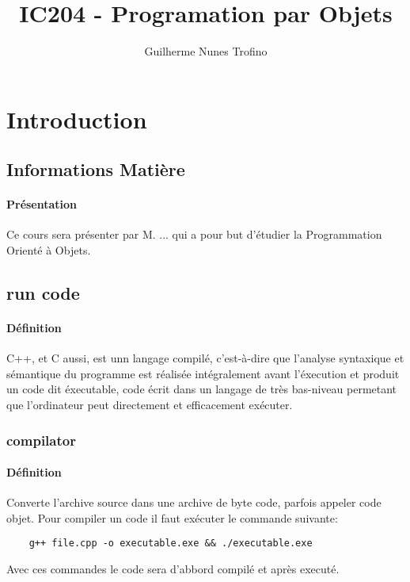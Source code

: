 \documentclass{article}
\title{IC204 - Programation par Objets}
\author{Guilherme Nunes Trofino}
\begin{document}
\maketitle

\newpage\tableofcontents

\section{Introduction}



\subsection{Informations Matière}
\paragraph{Présentation}Ce cours sera présenter par M. ... qui a pour but d'étudier la Programmation Orienté à Objets.

\subsection{run code}
\paragraph{Définition}C++, et C aussi, est unn langage compilé, c'est-à-dire que l'analyse syntaxique et sémantique du programme est réalisée intégralement avant l'éxecution et produit un code dit éxecutable, code écrit dans un langage de très bas-niveau permetant que l'ordinateur peut directement et efficacement exécuter.\\

\subsubsection{compilator}
\paragraph{Définition}Converte l'archive source dans une archive de byte code, parfois appeler code objet. Pour compiler un code il faut exécuter le commande suivante:
\begin{scriptsize}
    \myStyleCPP
    \begin{lstlisting}
    g++ file.cpp -o executable.exe && ./executable.exe
    \end{lstlisting}
\end{scriptsize}
Avec ces commandes le code sera d'abbord compilé et après executé.
\end{document}
